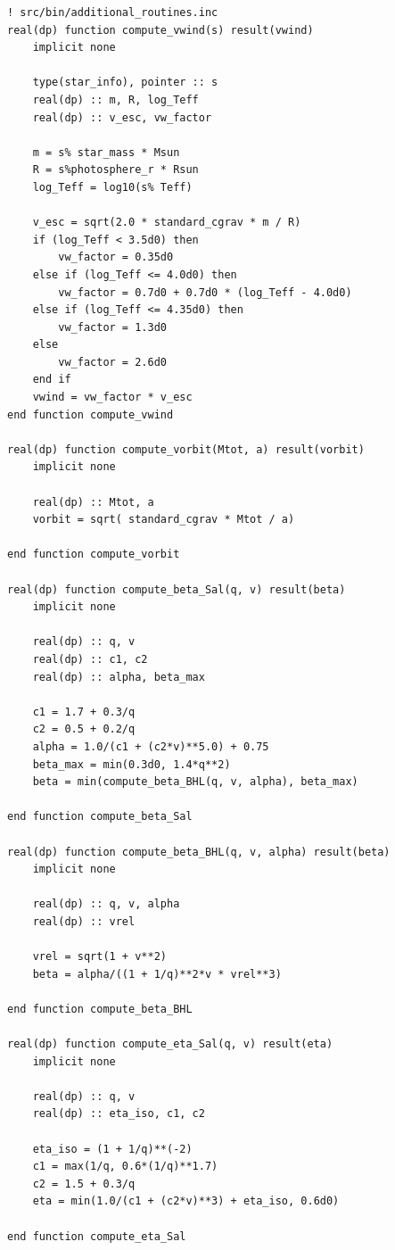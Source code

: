 \documentclass[a4paper,10pt]{article}
\begin{document}
\begin{verbatim}
! src/bin/additional_routines.inc
real(dp) function compute_vwind(s) result(vwind)
    implicit none

    type(star_info), pointer :: s
    real(dp) :: m, R, log_Teff
    real(dp) :: v_esc, vw_factor

    m = s% star_mass * Msun
    R = s%photosphere_r * Rsun
    log_Teff = log10(s% Teff)

    v_esc = sqrt(2.0 * standard_cgrav * m / R)
    if (log_Teff < 3.5d0) then
        vw_factor = 0.35d0
    else if (log_Teff <= 4.0d0) then
        vw_factor = 0.7d0 + 0.7d0 * (log_Teff - 4.0d0)
    else if (log_Teff <= 4.35d0) then
        vw_factor = 1.3d0
    else
        vw_factor = 2.6d0
    end if 
    vwind = vw_factor * v_esc
end function compute_vwind

real(dp) function compute_vorbit(Mtot, a) result(vorbit)
    implicit none

    real(dp) :: Mtot, a
    vorbit = sqrt( standard_cgrav * Mtot / a)

end function compute_vorbit

real(dp) function compute_beta_Sal(q, v) result(beta)
    implicit none

    real(dp) :: q, v
    real(dp) :: c1, c2
    real(dp) :: alpha, beta_max

    c1 = 1.7 + 0.3/q
    c2 = 0.5 + 0.2/q
    alpha = 1.0/(c1 + (c2*v)**5.0) + 0.75
    beta_max = min(0.3d0, 1.4*q**2)
    beta = min(compute_beta_BHL(q, v, alpha), beta_max)

end function compute_beta_Sal

real(dp) function compute_beta_BHL(q, v, alpha) result(beta)
    implicit none

    real(dp) :: q, v, alpha
    real(dp) :: vrel

    vrel = sqrt(1 + v**2)
    beta = alpha/((1 + 1/q)**2*v * vrel**3)

end function compute_beta_BHL

real(dp) function compute_eta_Sal(q, v) result(eta)
    implicit none

    real(dp) :: q, v
    real(dp) :: eta_iso, c1, c2

    eta_iso = (1 + 1/q)**(-2)
    c1 = max(1/q, 0.6*(1/q)**1.7)
    c2 = 1.5 + 0.3/q
    eta = min(1.0/(c1 + (c2*v)**3) + eta_iso, 0.6d0)

end function compute_eta_Sal
\end{verbatim}
\end{document}

